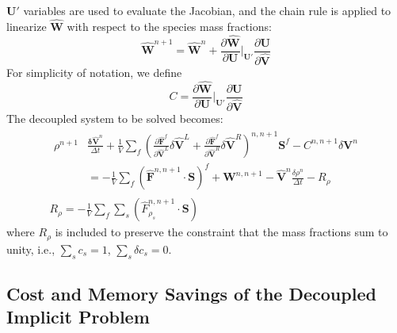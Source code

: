 $\mathbf{U}'$ variables are used to evaluate the Jacobian, and the chain rule is
applied to linearize $\mathbf{\hat{W}}$ with respect to the species mass
fractions:
\begin{equation}
  \mathbf{\hat{W}}^{n+1} = \mathbf{\hat{W}}^n+\frac{\partial
  \mathbf{\hat{W}}}{\partial \mathbf{U}}\bigg|_{\mathbf{U}'} \frac{\partial
  \mathbf{U}}{\partial \mathbf{\hat{V}}} 
\end{equation}
For simplicity of notation, we define
\begin{equation}
  C = \frac{\partial \mathbf{\hat{W}}}{\partial
  \mathbf{U}}\bigg|_{\mathbf{U}'} \frac{\partial \mathbf{U}}{\partial
  \mathbf{\hat{V}}}
\end{equation}
The decoupled system to be solved becomes:
\begin{gather} 
  \begin{split}
    \rho^{n+1}&\frac{\mathbf{\delta \hat{V}}^n}{\Delta t}
    +\frac{1}{V}\sum\limits_{f}(\frac{\partial \mathbf{\hat{F}}^f}{\partial
    \mathbf{\hat{V}}^L}\delta	\mathbf{\hat{V}}^L
    +\frac{\partial \mathbf{\hat{F}}^f}{\partial \mathbf{\hat{V}}^R}\delta
    \mathbf{\hat{V}}^R)^{n, n+1}\mathbf{S}^f - C^{n, n+1}\delta\mathbf{V}^n \\
    &= -\frac{1}{V}\sum\limits_{f}(\mathbf{\hat{F}}^{n,n+1}\cdot\mathbf{S})^f +
    \mathbf{W}^{n, n+1} -\mathbf{\hat{V}}^n\frac{\delta \rho^n}{\Delta t} -
    R_\rho
  \end{split} \\ 
  R_\rho = -\frac{1}{V}\sum\limits_{f}{\sum\limits_{s}
  {(\hat{F}_{\rho_s}^{n,n+1}\cdot\mathbf{S})}}
\end{gather}
where $R_\rho$ is included to preserve the constraint that the mass fractions
sum to unity, i.e., $\sum\limits_{s}{c_s}=1$, $\sum\limits_{s}{\delta
c_s}=0$.

\subsection{Cost and Memory Savings of the Decoupled Implicit Problem}

